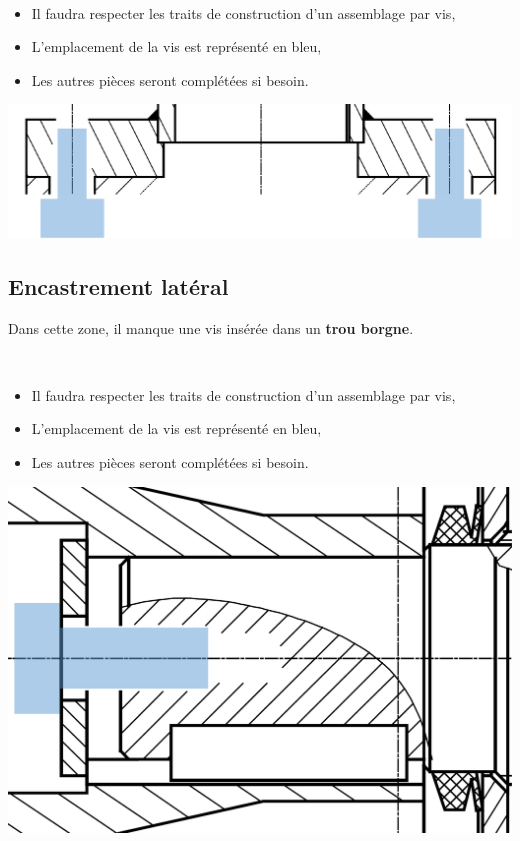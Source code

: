 ~\ \\
\begin{minipage}{0.55\linewidth}
\begin{itemize}
 \item Il faudra respecter les traits de construction d'un assemblage par vis,
 \item L'emplacement de la vis est représenté en bleu,
 \item Les autres pièces seront complétées si besoin.
\end{itemize}
\end{minipage}\hfill
\begin{minipage}{0.55\linewidth}
\begin{center}
 \includegraphics[width=0.9\linewidth]{img/fig4.pdf}
\end{center}
\end{minipage}

\subsection{Encastrement latéral}

Dans cette zone, il manque une vis insérée dans un \textbf{trou borgne}.

~\ \\
\begin{minipage}{0.6\linewidth}
\begin{itemize}
 \item Il faudra respecter les traits de construction d'un assemblage par vis,
 \item L'emplacement de la vis est représenté en bleu,
 \item Les autres pièces seront complétées si besoin.
\end{itemize}
\end{minipage}\hfill
\begin{minipage}{0.35\linewidth}
\begin{center}
 \includegraphics[width=0.9\linewidth]{img/fig5.pdf}
\end{center}
\end{minipage}


